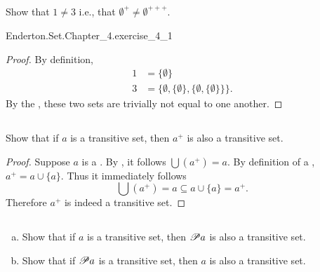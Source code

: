 \documentclass{report}
\begin{document}
\subsection{}%

  Show that $1 \neq 3$ i.e., that $\emptyset^+ \neq \emptyset^{+++}$.

    {Enderton.Set.Chapter\_4.exercise\_4\_1}

  \begin{proof}
    By definition,
      \begin{align*}
        1 & = \{\emptyset\} \\
        3 & = \{\emptyset, \{\emptyset\}, \{\emptyset, \{\emptyset\}\}\}.
      \end{align*}
    By the , these two sets are trivially not
      equal to one another.
  \end{proof}

\subsection{}%

  Show that if $a$ is a transitive set, then $a^+$ is also a transitive set.

  \begin{proof}
    Suppose $a$ is a .
    By , it follows $\bigcup \left(a^+\right) = a$.
    By definition of a , $a^+ = a \cup \{a\}$.
    Thus it immediately follows
      $$\bigcup \left(a^+\right) = a \subseteq a \cup \{a\} = a^+.$$
    Therefore $a^+$ is indeed a transitive set.
  \end{proof}

\subsection{}%

  \begin{enumerate}[(a)]
    \item Show that if $a$ is a transitive set, then $\mathscr{P}a$ is also a
      transitive set.
    \item Show that if $\mathscr{P}a$ is a transitive set, then $a$ is also a
      transitive set.
  \end{enumerate}
\end{document}
